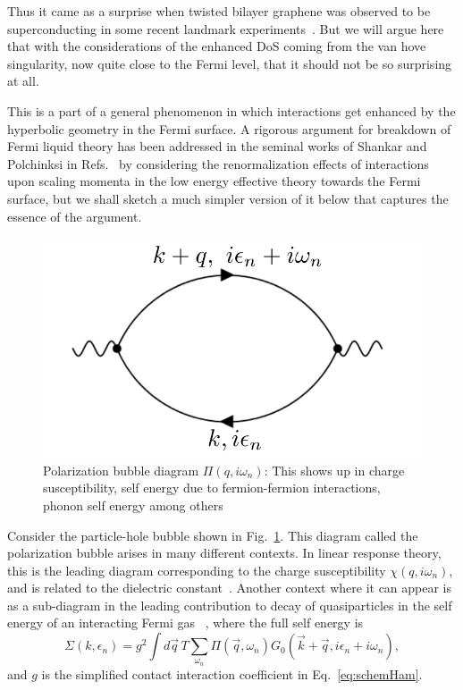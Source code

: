 \par
Thus it came as a surprise when twisted bilayer graphene was observed to be superconducting in some recent landmark experiments~\cite{Cao2018,Caocorrelated2018,oh2021evidence,lisi2021observation}. But we will argue here that with the considerations of the enhanced DoS coming from the van hove singularity, now quite close to the Fermi level, that it should not be so surprising at all. 

\par
This is a part of a general phenomenon in which interactions get enhanced by the hyperbolic geometry in the Fermi surface. A rigorous argument for breakdown of Fermi liquid theory has been addressed in the seminal works of Shankar and Polchinksi in Refs.~\cite{shankar1991renormalization,shankar1994renormalization,polchinski1992effective} by considering the renormalization effects of interactions upon scaling momenta in the low energy effective theory towards the Fermi surface, but we shall sketch a much simpler version of it below that captures the essence of the argument. 

\begin{figure}[h!]
    \centering
    \includegraphics[width=0.5\linewidth]{figures/introduction/LabeledChiQOmdiagramv2.pdf}
    \caption{Polarization bubble diagram $\Pi(q,i\omega_n)$: This shows up in charge susceptibility, self energy due to fermion-fermion interactions, phonon self energy among others}
    \label{fig:PHbubblediagram}
\end{figure}
Consider the particle-hole bubble shown in Fig.~\ref{fig:PHbubblediagram}. This diagram called the polarization bubble arises in many different contexts. In linear response theory, this is the leading diagram corresponding to the charge susceptibility $\chi(q,i\omega_n)$, and is related to the dielectric constant~\cite{coleman2015introduction}. Another context where it can appear is as a sub-diagram in the leading contribution to decay of quasiparticles in the self energy of an interacting Fermi gas ~\cite{Sachdev_2011}, where the full self energy is
\begin{equation}
\Sigma(k,\epsilon_n) = g^2\int d\vec{q} \,T\sum_{\omega_n}\Pi(\vec{q},\omega_n)G_0(\vec{k}+\vec{q},i\epsilon_n + i\omega_n), 
\end{equation}
and $g$ is the simplified contact interaction coefficient in Eq.~\eqref{eq:schemHam}.

